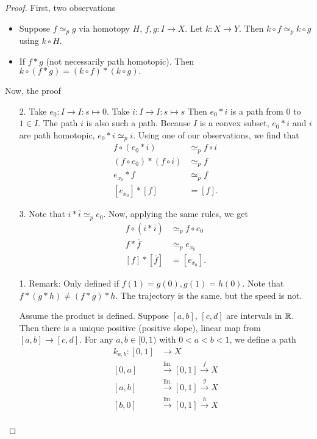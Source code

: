 \begin{proof}
    First, two observations
    \begin{itemize}
        \item Suppose $f\simeq_p g$ via homotopy $H$, $f, g: I\to X$.
            Let $k: X \to  Y$.
            Then $k  \circ  f \simeq_p k \circ g$ using $k  \circ H$.
        \item If $f*g$ (not necessarily path homotopic). Then $ k  \circ (f*g) = (k \circ f) * (k \circ g) .$ 
    \end{itemize}

    Now, the proof
    \begin{itemize}
        \item[2.]  Take $e_0: I \to  I: s \mapsto 0$.
            Take $i: I \to  I: s \mapsto s$ 
            Then $e_0*i$ is a path from $0$ to $1 \in I$.
            The path $i$ is also such a path.
            Because $I$ is a convex subset, $e_0*i$ and $i$ are path homotopic, $e_0 *i\simeq_p i$.
            Using one of our observations, we find that
            \begin{align*}
                f  \circ (e_0 * i) &\simeq_p  f  \circ i\\
                (f  \circ  e_0) * (f  \circ  i ) &\simeq_p f\\
                e_{x_0} * f  &\simeq_p f\\
                [e_{x_0}] * [f]  &= [f]
            .\end{align*}

        \item [3.] Note that $i * \overline{i} \simeq_p e_0$.
            Now, applying the same rules, we get 
            \begin{align*}
                f  \circ (i * \overline{i}) &\simeq_p f  \circ  e_0\\
                f * \overline{f} &\simeq_p  e_{x_0}\\
                [f] * [\overline{f}] & = [e_{x_0}]
            .\end{align*}
        \item[1.]  Remark: Only defined if $f(1) = g(0), g(1) = h(0)$.
            Note that $f*(g*h) \neq (f*g)*h$. The trajectory is the same, but the speed is not.

            Assume the product is defined.
            Suppose $[a, b]$,  $[c, d]$ are intervals in  $\mathbb{R}$.
            Then there is a unique positive (positive slope), linear map from $[a, b] \to [c,d]$.
            For any $a, b \in [0, 1)$ with $ 0<a<b<1$, we define a path
            \begin{align*}
                k_{a,b}: [0, 1] &\longrightarrow  X\\
                [0, a] & \xrightarrow{\text{lin.}}[0, 1] \xrightarrow{f}  X\\
                [a, b] & \xrightarrow{\text{lin.}}[0, 1] \xrightarrow{g}  X\\
                [b, 0] & \xrightarrow{\text{lin.}}[0, 1] \xrightarrow{h}  X\\
            \end{align*} 


\end{itemize}
\end{proof}

